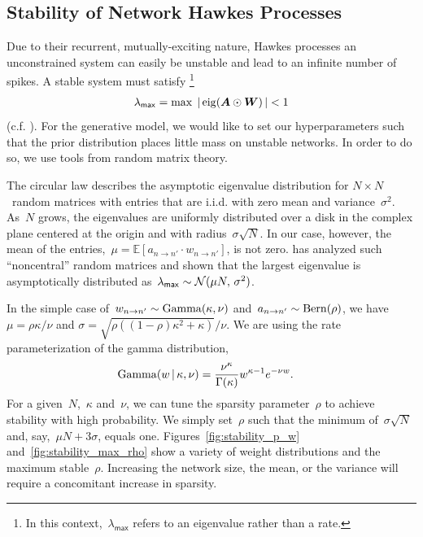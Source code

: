 
\subsection{Stability of Network Hawkes Processes}
\label{sec:stability}


Due to their recurrent, mutually-exciting nature, Hawkes processes
an unconstrained system can easily be unstable and lead to an infinite 
number of spikes. A stable system must satisfy \footnote{In
  this context,~${\lambda_{\mathsf{max}}}$ refers to an eigenvalue
  rather than a rate.}
\begin{align*}
  \lambda_{\mathsf{max}}=\max\; |\,\mathrm{eig}(\boldsymbol{A}\odot\boldsymbol{W})\,| < 1
\end{align*}
(c.f. \citet{Daley-1988}).
For the generative model, we would like
to set our hyperparameters such that the prior distribution places
little mass on unstable networks. In order to do so, we use tools from
random matrix theory.

The circular law describes the asymptotic eigenvalue distribution for
$N \times N$~random matrices with entries that are i.i.d. with zero
mean and variance~$\sigma^2$. As~$N$ grows, the eigenvalues are
uniformly distributed over a disk in the complex plane centered at the
origin and with radius~$\sigma\sqrt{N}$. In our case, however, the
mean of the entries,~${\mu=\mathbb{E}[a_{n \to n'} \cdot w_{n \to
      n'}]}$, is not zero. \citet{Silverstein-1994} has analyzed such
``noncentral'' random matrices and shown that the largest eigenvalue
is asymptotically distributed
as~${\lambda_{\sf{max}} \sim \mathcal{N}(\mu N,\, \sigma^2)}$.

In the simple case of~${w_{n \to n'}\sim \mathrm{Gamma}(\kappa,\nu)}$
and~${a_{n \to n'}\sim\mathrm{Bern}(\rho)}$, we have
${\mu = \rho \kappa/\nu}$ and
${\sigma=\sqrt{\rho((1-\rho)\kappa^2+\kappa)}/\nu}$. We are using the 
rate parameterization of the gamma distribution, 
\begin{align*}
\mathrm{Gamma}(w \,|\, \kappa, \nu) &= \frac{\nu^{\kappa}}{\Gamma(\kappa)}w^{\kappa- 1} e^{-\nu w}.
\end{align*}
For a
given~$N$,~$\kappa$ and~$\nu$, we can tune the sparsity
parameter~$\rho$ to achieve stability with high probability. We simply
set~$\rho$ such that the minimum of~$\sigma\sqrt{N}$ and,
say,~${\mu N + 3\sigma}$, equals one. Figures~\ref{fig:stability_p_w}
and~\ref{fig:stability_max_rho} show a variety of weight distributions
and the maximum stable~$\rho$. Increasing the network size, the mean,
or the variance will require a concomitant increase in sparsity.

